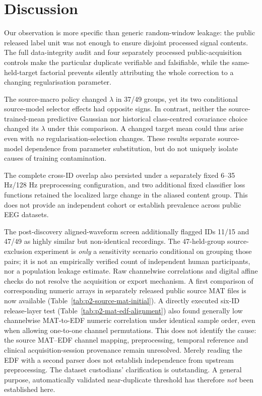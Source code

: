 \documentclass[11pt,a4paper]{article}
\begin{document}
\section{Discussion}
Our observation is more specific than generic random-window leakage:
the public released label unit was not enough to ensure disjoint
processed signal contents. The full data-integrity audit and four
separately processed public-acquisition controls make the particular duplicate
verifiable and falsifiable, while the same-held-target factorial
prevents silently attributing the whole correction to a changing
regularisation parameter.

The source-macro policy changed $\lambda$ in 37/49 groups,
yet its two conditional source-model selector effects had
opposite signs. In contrast, neither the source-trained-mean
predictive Gaussian nor historical class-centred covariance
choice changed its $\lambda$ under this comparison. A changed
target mean could thus arise even with \emph{no}
regularisation-selection changes. These results separate
source-model dependence from parameter substitution, but do
not uniquely isolate causes of training contamination.

The complete cross-ID overlap also persisted under a separately fixed
6--35 Hz/128 Hz preprocessing configuration, and two additional fixed
classifier loss functions retained the localized large change in the
aliased content group. This does not provide an independent cohort or
establish prevalence across public EEG datasets.

The post-discovery aligned-waveform screen additionally flagged
IDs 11/15 and 47/49 as highly similar but non-identical
recordings. The 47-held-group source-exclusion experiment is
\emph{only} a sensitivity scenario conditional on grouping
those pairs; it is not an empirically verified count of
independent human participants, nor a population leakage
estimate. Raw channelwise correlations and digital affine
checks do not resolve the acquisition or export mechanism.
A first comparison of corresponding numeric
arrays in separately released public source MAT
files is now available
(Table~\ref{tab:p2-source-mat-initial}).
A directly executed six-ID release-layer test
(Table~\ref{tab:p2-mat-edf-alignment}) also found
generally low channelwise MAT-to-EDF numeric
correlation under identical sample order,
even when allowing one-to-one channel permutations.
This does not identify the cause:
the source MAT--EDF channel mapping, preprocessing,
temporal reference and clinical acquisition-session
provenance remain unresolved. Merely reading the
EDF with a second parser does not establish
independence from upstream preprocessing.
The dataset custodians' clarification is outstanding.
A general purpose, automatically validated near-duplicate
threshold has therefore \emph{not} been established here.
\end{document}

